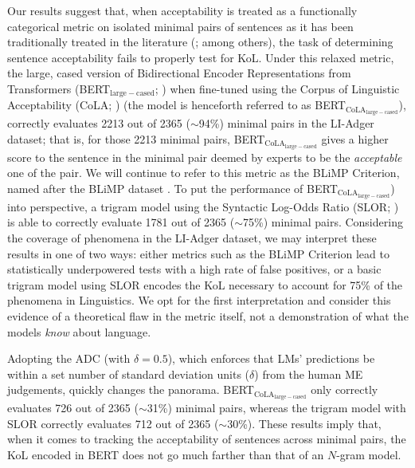 Our results suggest that, when acceptability is treated as a functionally categorical metric on isolated minimal pairs of sentences as it has been traditionally treated in the literature (\citealp{linzen2016assessing,marvin2018targeted,wilcox2018rnn,warstadt2020can}; among others), the task of determining sentence acceptability fails to properly test for KoL.  Under this relaxed metric, the large, cased version of Bidirectional Encoder Representations from Transformers (BERT$_{\mathrm{large-cased}}$; \citealp{devlin2018bert}) when fine-tuned using the Corpus of Linguistic Acceptability (CoLA; \citealp{warstadt2019neural}) (the model is henceforth referred to as BERT$_\mathrm{CoLA_{large-cased}}$), correctly evaluates 2213 out of 2365 ($\sim$94\%) minimal pairs in the LI-Adger dataset; that is, for those 2213 minimal pairs, BERT$_\mathrm{CoLA_{large-cased}}$ gives a higher score to the sentence in the minimal pair deemed by experts to be the \textit{acceptable} one of the pair.  We will continue to refer to this metric as the BLiMP Criterion, named after the BLiMP dataset \citep{warstadt2019blimp}.  To put the performance of BERT$_\mathrm{CoLA_{large-cased}}$) into perspective, a trigram model using the Syntactic Log-Odds Ratio (SLOR; \citealp{pauls2012large,lau2017grammaticality}) is able to correctly evaluate 1781 out of 2365 ($\sim$75\%) minimal pairs.  Considering the coverage of phenomena in the LI-Adger dataset, we may interpret these results in one of two ways: either metrics such as the BLiMP Criterion lead to statistically underpowered tests with a high rate of false positives, or a basic trigram model using SLOR encodes the KoL necessary to account for 75\% of the phenomena in Linguistics.  We opt for the first interpretation and consider this evidence of a theoretical flaw in the metric itself, not a demonstration of what the models \textit{know} about language.

Adopting the ADC (with $\delta=0.5$), which enforces that LMs' predictions be within a set number of standard deviation units ($\delta$) from the human ME judgements, quickly changes the panorama.  BERT$_\mathrm{CoLA_{large-cased}}$ only correctly evaluates 726 out of 2365 ($\sim$31\%) minimal pairs, whereas the trigram model with SLOR correctly evaluates 712 out of 2365 ($\sim$30\%).  These results imply that, when it comes to tracking the acceptability of sentences across minimal pairs, the KoL encoded in BERT does not go much farther than that of an $N$-gram model.


